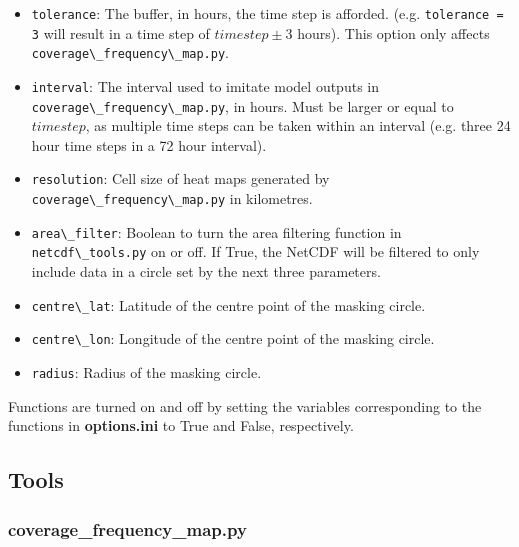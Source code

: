 \documentclass{article}
\begin{document}
\begin{itemize}
\begin{itemize}
                    \item \verb?tolerance?: The buffer, in hours, the time step is afforded. (e.g. \verb?tolerance = 3? will result in a time step of $timestep \pm 3$ hours). This option only affects \verb?coverage\_frequency\_map.py?.
                    \item \verb?interval?: The interval used to imitate model outputs in \verb?coverage\_frequency\_map.py?, in hours. Must be larger or equal to $timestep$, as multiple time steps can be taken within an interval (e.g. three 24 hour time steps in a 72 hour interval).
                    \item \verb?resolution?: Cell size of heat maps generated by \verb?coverage\_frequency\_map.py? in kilometres.
                    \item \verb?area\_filter?: Boolean to turn the area filtering function in \verb?netcdf\_tools.py? on or off. If True, the NetCDF will be filtered to only include data in a circle set by the next three parameters.
                    \item \verb?centre\_lat?: Latitude of the centre point of the masking circle.
                    \item \verb?centre\_lon?: Longitude of the centre point of the masking circle.
                    \item \verb?radius?: Radius of the masking circle.
                \end{itemize}
            \end{itemize}

        Functions are turned on and off by setting the variables corresponding to the functions in \textbf{options.ini} to True and False, respectively.

    \subsection{Tools}

        \subsubsection{\textbf{coverage\_frequency\_map.py}}
\end{document}
